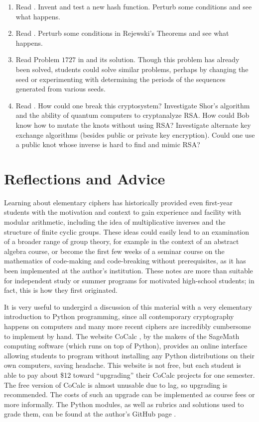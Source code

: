 \documentclass[11pt]{article}
\theoremstyle{plain}
\theoremstyle{remark}
\theoremstyle{definition}
\theoremstyle{definition}
\theoremstyle{definition}
\theoremstyle{plain}
\theoremstyle{plain}
\theoremstyle{plain}
\theoremstyle{definition}
\begin{document}
\begin{enumerate}
\item Read \cite{smithMakingHashThings2015a}. Invent and test a new hash
function. Perturb some conditions and see what happens.
\item Read \cite{christensenPolishMathematiciansFinding2007a}. Perturb
some conditions in Rejewski's Theorems and see what happens.
\item Read Problem $1727$ in \cite{johnstonProblems2006} and its solution.
Though this problem has already been solved, students could solve
similar problems, perhaps by changing the seed or experimenting with
determining the periods of the sequences generated from various seeds.
\item Read \cite{marzuoliPostQuantumCryptography2011}. How could one break
this cryptosystem? Investigate Shor's algorithm and the ability of
quantum computers to cryptanalyze RSA. How could Bob know how to mutate
the knots without using RSA? Investigate alternate key exchange algorithms
(besides public or private key encryption). Could one use a public
knot whose inverse is hard to find and mimic RSA?
\end{enumerate}

\section{Reflections and Advice}

Learning about elementary ciphers has historically provided even first-year
students with the motivation and context to gain experience and facility
with modular arithmetic, including the idea of multiplicative inverses
and the structure of finite cyclic groups. These ideas could easily
lead to an examination of a broader range of group theory, for example
in the context of an abstract algebra course, or become the first
few weeks of a seminar course on the mathematics of code-making and
code-breaking without prerequisites, as it has been implemented at the author's
institution. These notes are more than suitable for independent study
or summer programs for motivated high-school students; in fact, this
is how they first originated. 

It is very useful to undergird a discussion of this material with
a very elementary introduction to Python programming, since all contemporary
cryptography happens on computers and many more recent ciphers are
incredibly cumbersome to implement by hand. The website CoCalc \cite{CoCalcCollaborativeCalculation},
by the makers of the SageMath computing software (which runs on top
of Python), provides an online interface allowing students to program
without installing any Python distributions on their own computers,
saving headache. This website is not free, but each student is able
to pay about \$12 toward ``upgrading'' their CoCalc projects for one
semester. The free version of CoCalc is almost unusable
due to lag, so upgrading is recommended. The costs of such an upgrade can be implemented as course fees or more informally.
The Python modules, as well as rubrics and solutions used to grade
them, can be found at the author's GitHub page \cite{inceResourcesFirstYearCollege2022}.
\end{document}
